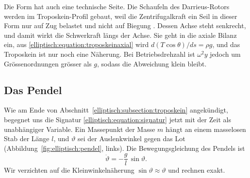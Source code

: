 Die Form hat auch eine technische Seite.
Die Schaufeln des Darrieus-Rotors werden im Troposkein-Profil
gebaut, weil die Zentrifugalkraft ein Seil in dieser Form nur auf
Zug belastet und nicht auf Biegung
\cite{elliptisch:wiki-darrieus}.
%
Dessen Achse steht senkrecht, und damit wirkt die Schwerkraft
längs der Achse.
Sie geht in die axiale Bilanz ein, aus
\eqref{elliptisch:equation:troposkeinaxial} wird
$d(T\cos\theta)/ds = \rho g$, und das Troposkein ist nur noch eine
Näherung.
Bei Betriebsdrehzahl ist $\omega^2 y$ jedoch um Grössenordnungen
grösser als $g$, sodass die Abweichung klein bleibt.


\subsection{Das Pendel
\label{elliptisch:subsection:pendel}}
Wie am Ende von Abschnitt~\ref{elliptisch:subsection:troposkein}
angekündigt, begegnet uns die Signatur
\eqref{elliptisch:equation:signatur} jetzt mit der Zeit als
unabhängiger Variable.
Ein Massepunkt der Masse $m$ hängt an einem masselosen Stab der
Länge $l$, und $\vartheta$ sei der Auslenkwinkel gegen das Lot
(Abbildung~\ref{fig:elliptisch:pendel}, links).
%
Die Bewegungsgleichung des Pendels ist
\begin{equation}
\ddot{\vartheta} = -\frac{g}{l}\,\sin\vartheta.
\label{elliptisch:equation:pendelbewegung}
\end{equation}
Wir verzichten auf die Kleinwinkelnäherung
%
$\sin\vartheta \approx \vartheta$ und rechnen exakt.

